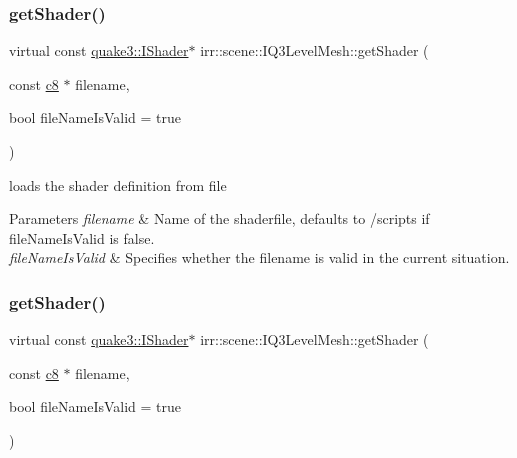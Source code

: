 \subsubsection{\texorpdfstring{get\+Shader()}{getShader()}\hspace{0.1cm}{\footnotesize\ttfamily [1/2]}}
{\footnotesize\ttfamily virtual const \hyperlink{structirr_1_1scene_1_1quake3_1_1IShader}{quake3\+::\+I\+Shader}$\ast$ irr\+::scene\+::\+I\+Q3\+Level\+Mesh\+::get\+Shader (\begin{DoxyParamCaption}\item[{const \hyperlink{namespaceirr_a9395eaea339bcb546b319e9c96bf7410}{c8} $\ast$}]{filename,  }\item[{bool}]{file\+Name\+Is\+Valid = {\ttfamily true} }\end{DoxyParamCaption})\hspace{0.3cm}{\ttfamily [pure virtual]}}



loads the shader definition from file 


\begin{DoxyParams}{Parameters}
{\em filename} & Name of the shaderfile, defaults to /scripts if file\+Name\+Is\+Valid is false. \\
\hline
{\em file\+Name\+Is\+Valid} & Specifies whether the filename is valid in the current situation. \\
\hline
\end{DoxyParams}
\mbox{\label{classirr_1_1scene_1_1IQ3LevelMesh_aa2f9609e950e32876665d7531a54a484}} 
\subsubsection{\texorpdfstring{get\+Shader()}{getShader()}\hspace{0.1cm}{\footnotesize\ttfamily [2/2]}}
{\footnotesize\ttfamily virtual const \hyperlink{structirr_1_1scene_1_1quake3_1_1IShader}{quake3\+::\+I\+Shader}$\ast$ irr\+::scene\+::\+I\+Q3\+Level\+Mesh\+::get\+Shader (\begin{DoxyParamCaption}\item[{const \hyperlink{namespaceirr_a9395eaea339bcb546b319e9c96bf7410}{c8} $\ast$}]{filename,  }\item[{bool}]{file\+Name\+Is\+Valid = {\ttfamily true} }\end{DoxyParamCaption})\hspace{0.3cm}{\ttfamily [pure virtual]}}



